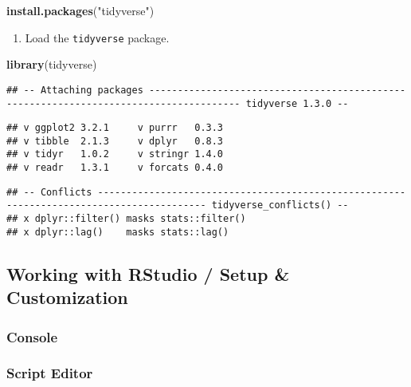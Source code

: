 \documentclass[]{article}
\newenvironment{Shaded}{\begin{snugshade}}{\end{snugshade}}
\newcommand{\KeywordTok}[1]{\textcolor[rgb]{0.13,0.29,0.53}{\textbf{#1}}}
\newcommand{\NormalTok}[1]{#1}
\newcommand{\StringTok}[1]{\textcolor[rgb]{0.31,0.60,0.02}{#1}}
\providecommand{\tightlist}{%
  \setlength{\itemsep}{0pt}\setlength{\parskip}{0pt}}
\begin{document}
\begin{Shaded}
\begin{Highlighting}[]
\KeywordTok{install.packages}\NormalTok{(}\StringTok{"tidyverse"}\NormalTok{)}
\end{Highlighting}
\end{Shaded}

\begin{enumerate}
\def\labelenumi{\arabic{enumi}.}
\setcounter{enumi}{1}
\tightlist
\item
  Load the \texttt{tidyverse} package.
\end{enumerate}

\begin{Shaded}
\begin{Highlighting}[]
\KeywordTok{library}\NormalTok{(tidyverse)}
\end{Highlighting}
\end{Shaded}

\begin{verbatim}
## -- Attaching packages -------------------------------------------------------------------------------------- tidyverse 1.3.0 --
\end{verbatim}

\begin{verbatim}
## v ggplot2 3.2.1     v purrr   0.3.3
## v tibble  2.1.3     v dplyr   0.8.3
## v tidyr   1.0.2     v stringr 1.4.0
## v readr   1.3.1     v forcats 0.4.0
\end{verbatim}

\begin{verbatim}
## -- Conflicts ----------------------------------------------------------------------------------------- tidyverse_conflicts() --
## x dplyr::filter() masks stats::filter()
## x dplyr::lag()    masks stats::lag()
\end{verbatim}

\hypertarget{working-with-rstudio-setup-customization}{%
\subsection{Working with RStudio / Setup \& Customization}\label{working-with-rstudio-setup-customization}}

\hypertarget{console}{%
\subsubsection{Console}\label{console}}

\hypertarget{script-editor}{%
\subsubsection{Script Editor}\label{script-editor}}
\end{document}
